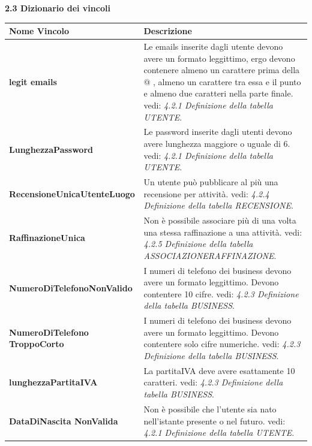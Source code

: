 \documentclass[a4paper,12pt]{article}
\begin{document}
\newpage\null{}\setcounter{page}{8}
\vspace{-2cm}
\begin{flushleft}
{\bf 2.3 Dizionario dei vincoli} 
\vspace{+1cm}
\begin{table}[htbp]
\begin{tabular}[c]{| m{6cm} | m{10cm} |}
\hline
\bf Nome Vincolo&\bf Descrizione\\
\hline

{\bf legit emails}
&\small Le emails inserite dagli utente devono avere un formato leggittimo, ergo devono contenere almeno un carattere prima della @ , almeno un carattere tra essa e il punto e almeno due caratteri nella parte
finale.
vedi: {\it 4.2.1 Definizione della tabella UTENTE}.
\\
\hline

{\bf LunghezzaPassword}
&\small Le password inserite dagli utenti devono avere lunghezza maggiore o uguale di 6.
vedi: {\it 4.2.1 Definizione della tabella UTENTE}.
\\
\hline

{\bf RecensioneUnicaUtenteLuogo}
&\small Un utente può pubblicare al più una recensione per attività.
vedi: {\it 4.2.4 Definizione della tabella RECENSIONE}.
\\
\hline

{\bf RaffinazioneUnica}
&\small Non è possibile associare più di una volta una stessa raffinazione a una attività.
vedi: {\it 4.2.5 Definizione della tabella ASSOCIAZIONERAFFINAZIONE}.
\\
\hline

{\bf NumeroDiTelefonoNonValido}
&\small I numeri di telefono dei business devono avere un formato leggittimo. Devono contentere 10 cifre.
vedi: {\it 4.2.3 Definizione della tabella BUSINESS}.
\\
\hline

{\bf NumeroDiTelefono
TroppoCorto}
&\small I numeri di telefono dei business devono avere un formato leggittimo. Devono contentere solo cifre numeriche.
vedi: {\it 4.2.3 Definizione della tabella BUSINESS}.
\\
\hline

{\bf lunghezzaPartitaIVA}
&\small La partitaIVA deve avere esattamente 10 caratteri.
vedi: {\it 4.2.3 Definizione della tabella BUSINESS}.
\\
\hline

{\bf DataDiNascita
NonValida}
&\small Non è possibile che l'utente sia nato nell'istante presente o nel futuro.
vedi: {\it 4.2.1 Definizione della tabella UTENTE}.
\\
\hline


\end{tabular}
\end{table}
\end{flushleft}
\end{document}
